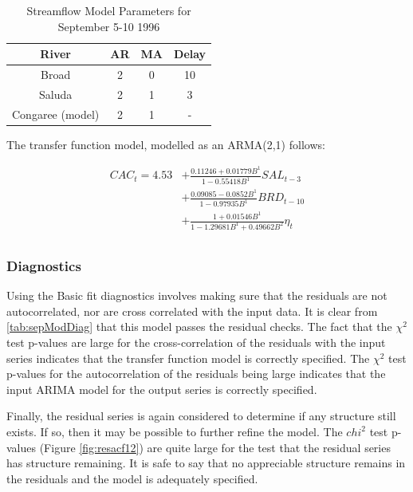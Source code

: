 \documentclass[12pt]{report}
\begin{document}
\begin{table}[h]
\begin{centering}
\begin{tabular}{|c|c|c|c|}
\hline
\textbf{River}  & \textbf{AR} & \textbf{MA} & \textbf{Delay} \\
\hline Broad & 2 & 0 & 10 \\
Saluda & 2 & 1 & 3 \\
Congaree (model) & 2 & 1 & - \\
\hline
\end{tabular}\caption{Streamflow Model Parameters for September 5-10 1996}
\end{centering}
\end{table}

The transfer function model, modelled as an ARMA(2,1) follows:


\begin{equation}
\begin{split}
\label{eq:5sepmodel}
CAC_t=4.53&+\frac{0.11246+0.01779 B^1}{1-0.55418 B^1}SAL_{t-3}\\
&+\frac{0.09085-0.0852 B^1}{1-0.97935 B^1}BRD_{t-10}\\
&+\frac{1+0.01546 B^1}{1-1.29681 B^1 + 0.49662 B^2}\eta_t\\
\end{split}
\end{equation}

\subsubsection{Diagnostics}
Using the Basic fit diagnostics involves making sure that the
residuals are not autocorrelated, nor are cross correlated with
the input data. It is clear from \ref{tab:sepModDiag} that this
model passes the residual checks.  The fact that the $\chi^2$ test
p-values are large for the cross-correlation of the residuals with
the input series indicates that the transfer function model is
correctly specified. The $\chi^2$ test p-values for the
autocorrelation of the residuals being large indicates that the
input ARIMA model for the output series is correctly specified.

Finally, the residual series is again considered to determine if
any structure still exists.  If so, then it may be possible to
further refine the model.  The $chi^2$ test p-values (Figure
\ref{fig:resacf12}) are quite large for the test that the residual
series has structure remaining. It is safe to say that no
appreciable structure remains in the residuals and the model is
adequately specified.
\end{document}
